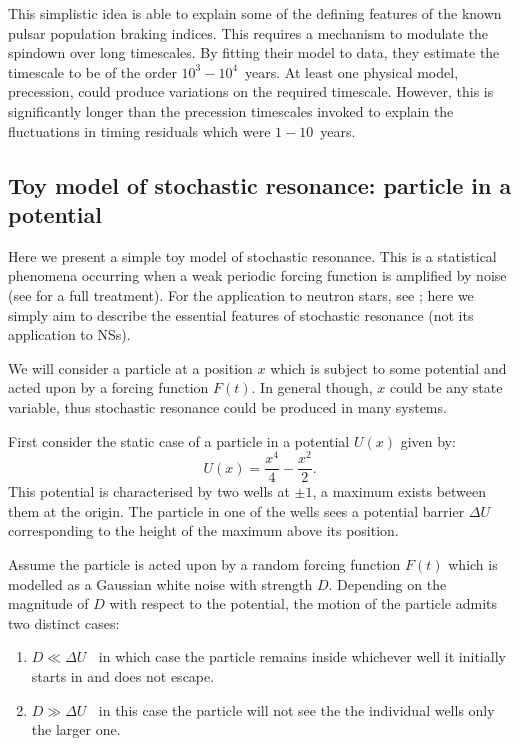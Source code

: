 This simplistic idea is able to explain some of the defining features of the
known pulsar population braking indices. This requires a mechanism to modulate
the spindown over long timescales. By fitting their model to data, they
estimate the timescale to be of the order $10^{3}-10^{4}$~years. At least one
physical model, precession, could produce variations on the required timescale.
However, this is significantly longer than the precession timescales invoked to
explain the fluctuations in timing residuals which were $1-10$~years.
\begin{subappendices}
\subsection{Toy model of stochastic resonance: particle in a potential}
\label{App: Stochastic}

Here we present a simple toy model of stochastic resonance. This is a
statistical phenomena occurring when a weak periodic forcing function is
amplified by noise (see \citet{Jung1991} for a full treatment).  For the
application to neutron stars, see \citet{Cordes2013}; here we simply aim to
describe the essential features of stochastic resonance (not its application to
NSs).

We will consider a particle at a position $x$ which is subject to some
potential and acted upon by a forcing function $F(t)$. In general though, $x$
could be any state variable, thus stochastic resonance could be produced
in many systems.

First consider the static case of a particle in a potential $U(x)$  given by:
\begin{equation}
    U(x) = \frac{x^{4}}{4}-\frac{x^{2}}{2}.
\end{equation}
This potential is characterised by two wells at $\pm1$, a maximum exists
between them at the origin. The particle in one of the wells sees a potential
barrier $\Delta U$ corresponding to the height of the maximum above its
position.

Assume the particle is acted upon by a random forcing function $F(t)$ which is
modelled as a Gaussian white noise with strength $D$. Depending on the
magnitude of $D$ with respect to the potential, the motion of the particle
admits two distinct cases:
\begin{enumerate}
\item $D \ll \Delta U \;\;$ in which case the particle remains inside whichever
    well it initially starts in and does not escape.
\item $D \gg \Delta U \;\;$ in this case the particle will not see the the
    individual wells only the larger one.
\end{enumerate}


\end{subappendices}

